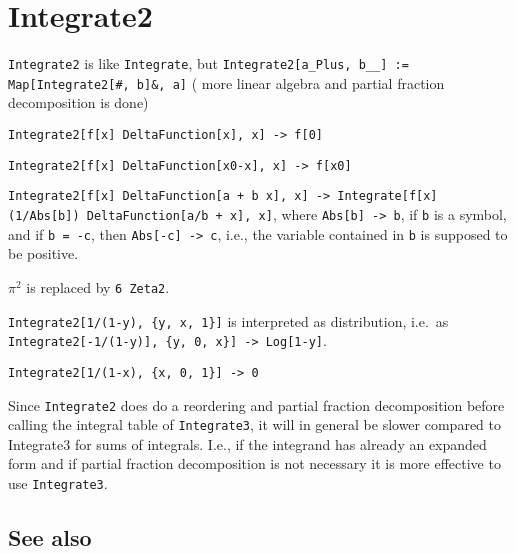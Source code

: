 \documentclass[../FeynCalcManual.tex]{subfiles}
\begin{document}
\hypertarget{integrate2}{
\section{Integrate2}\label{integrate2}}

\texttt{Integrate2} is like \texttt{Integrate}, but
\texttt{Integrate2[\allowbreak{}a_Plus,\ \allowbreak{}b__] := Map[\allowbreak{}Integrate2[\allowbreak{}\#{}\allowbreak{},\ \allowbreak{}b]\&{}\allowbreak{},\ \allowbreak{}a]}
( more linear algebra and partial fraction decomposition is done)

\texttt{Integrate2[\allowbreak{}f[\allowbreak{}x] DeltaFunction[\allowbreak{}x],\ \allowbreak{}x] -> f[\allowbreak{}0]}

\texttt{Integrate2[\allowbreak{}f[\allowbreak{}x] DeltaFunction[\allowbreak{}x0-x],\ \allowbreak{}x] -> f[\allowbreak{}x0]}

\texttt{Integrate2[\allowbreak{}f[\allowbreak{}x] DeltaFunction[\allowbreak{}a + b x],\ \allowbreak{}x] -> Integrate[\allowbreak{}f[\allowbreak{}x] (1/Abs[\allowbreak{}b]) DeltaFunction[\allowbreak{}a/b + x],\ \allowbreak{}x]},
where \texttt{Abs[\allowbreak{}b] -> b}, if \texttt{b} is a symbol, and
if \texttt{b = -c}, then \texttt{Abs[\allowbreak{}-c] -> c}, i.e., the
variable contained in \texttt{b} is supposed to be positive.

\(\pi ^2\) is replaced by \texttt{6 Zeta2}.

\texttt{Integrate2[\allowbreak{}1/(1-y),\ \allowbreak{}\{\allowbreak{}y,\ \allowbreak{}x,\ \allowbreak{}1\}]}
is interpreted as distribution, i.e.~as
\texttt{Integrate2[\allowbreak{}-1/(1-y)],\ \allowbreak{}\{\allowbreak{}y,\ \allowbreak{}0,\ \allowbreak{}x\}] -> Log[\allowbreak{}1-y]}.

\texttt{Integrate2[\allowbreak{}1/(1-x),\ \allowbreak{}\{\allowbreak{}x,\ \allowbreak{}0,\ \allowbreak{}1\}] -> 0}

Since \texttt{Integrate2} does do a reordering and partial fraction
decomposition before calling the integral table of \texttt{Integrate3},
it will in general be slower compared to Integrate3 for sums of
integrals. I.e., if the integrand has already an expanded form and if
partial fraction decomposition is not necessary it is more effective to
use \texttt{Integrate3}.

\subsection{See also}
\end{document}
